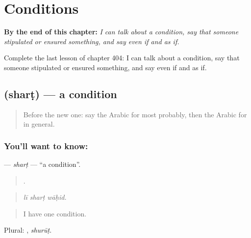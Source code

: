 
\chapter{Conditions}
\label{ch:ar-conditions}

\begin{chapteropening}
\textbf{By the end of this chapter:} \emph{I can talk about a condition, say that someone stipulated or ensured something, and say even if and as if.}

Complete the last lesson of chapter 404: I can talk about a condition, say that someone stipulated or ensured something, and say even if and as if.
\end{chapteropening}

\section[\texorpdfstring{\ar{شرط} (sharṭ)}{شرط (sharṭ)}]{ (sharṭ) — a condition}

\label{lesson:AR-C404-shart}



\begin{quote}
Before the new one: say the Arabic for most probably, then the Arabic for in general.
\end{quote}

\subsection*{You'll want to know: }
\textbf{} — \emph{sharṭ} — \textquotedblleft{}a condition\textquotedblright{}.

\begin{quote}
  .
\end{quote}

\begin{quote}
\emph{lī sharṭ wāḥid.}
\end{quote}

\begin{quote}
I have one condition.
\end{quote}

Plural: , \emph{shurūṭ}.

